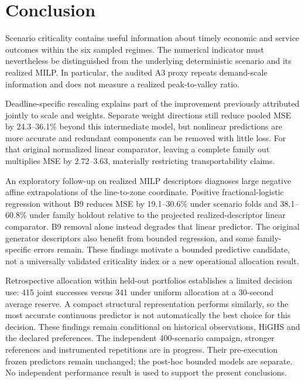 \section{Conclusion}
Scenario criticality contains useful information about timely economic and
service outcomes within the six sampled regimes. The numerical indicator
must nevertheless be distinguished from the underlying deterministic
scenario and its realized MILP. In particular, the audited A3 proxy repeats
demand-scale information and does not measure a realized peak-to-valley ratio.

Deadline-specific rescaling explains part of the improvement previously
attributed jointly to scale and weights. Separate weight directions still
reduce pooled MSE by 24.3--36.1\% beyond this intermediate model, but
nonlinear predictions are more accurate and redundant components can be
removed with little loss. For that original normalized linear comparator,
leaving a complete family out multiplies MSE by 2.72--3.63, materially
restricting transportability claims.

An exploratory follow-up on realized MILP descriptors diagnoses large
negative affine extrapolations of the line-to-zone coordinate. Positive
fractional-logistic regression without B9 reduces MSE by 19.1--30.6\%
under scenario folds and 38.1--60.8\% under family holdout relative to the
projected realized-descriptor linear comparator. B9 removal alone instead
degrades that linear predictor. The original generator descriptors also
benefit from bounded regression, and some family-specific errors remain.
These findings motivate a bounded predictive candidate, not a universally
validated criticality index or a new operational allocation result.

Retrospective allocation within held-out portfolios establishes a limited
decision use: 415 joint successes versus 341 under uniform allocation at a
30-second average reserve. A compact structural representation performs
similarly, so the most accurate continuous predictor is not automatically
the best choice for this decision. These findings remain conditional on
historical observations, HiGHS and the declared preferences. The independent
400-scenario campaign, stronger references and instrumented repetitions
are in progress. Their pre-execution frozen predictors remain unchanged;
the post-hoc bounded models are separate. No independent performance result
is used to support the present conclusions.

\appendix



